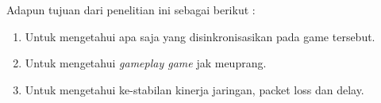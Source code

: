 Adapun tujuan dari penelitian ini sebagai berikut :
\begin{enumerate}
	\item Untuk mengetahui apa saja yang disinkronisasikan pada game tersebut.
	\item Untuk mengetahui \textit{gameplay game} jak meuprang.
	\item Untuk mengetahui ke-stabilan kinerja jaringan, packet loss dan delay. 
\end{enumerate}







